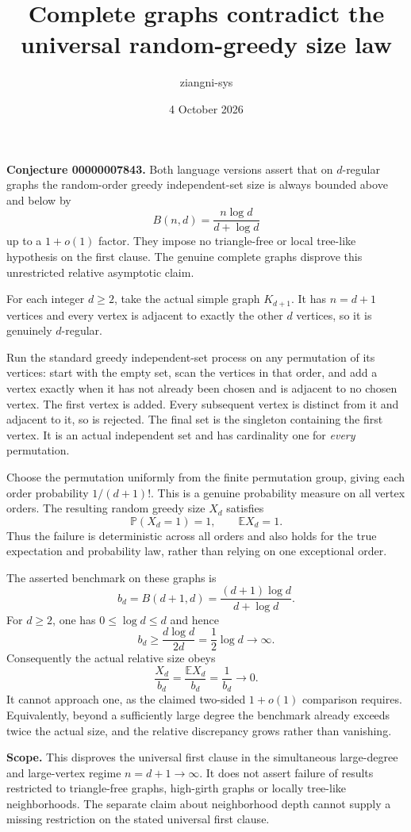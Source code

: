 \documentclass[11pt]{article}
\title{Complete graphs contradict the universal random-greedy size law}
\author{ziangni-sys}
\date{4 October 2026}
\begin{document}
\maketitle
\noindent\textbf{Conjecture 00000007843.} Both language versions assert that on \(d\)-regular graphs the random-order greedy independent-set size is always bounded above and below by
\[
 B(n,d)=\frac{n\log d}{d+\log d}
\]
up to a \(1+o(1)\) factor. They impose no triangle-free or local tree-like hypothesis on the first clause. The genuine complete graphs disprove this unrestricted relative asymptotic claim.

For each integer \(d\ge2\), take the actual simple graph \(K_{d+1}\). It has \(n=d+1\) vertices and every vertex is adjacent to exactly the other \(d\) vertices, so it is genuinely \(d\)-regular.

Run the standard greedy independent-set process on any permutation of its vertices: start with the empty set, scan the vertices in that order, and add a vertex exactly when it has not already been chosen and is adjacent to no chosen vertex. The first vertex is added. Every subsequent vertex is distinct from it and adjacent to it, so is rejected. The final set is the singleton containing the first vertex. It is an actual independent set and has cardinality one for \emph{every} permutation.

Choose the permutation uniformly from the finite permutation group, giving each order probability \(1/(d+1)!\). This is a genuine probability measure on all vertex orders. The resulting random greedy size \(X_d\) satisfies
\[
 \mathbb P(X_d=1)=1,\qquad \mathbb E X_d=1.
\]
Thus the failure is deterministic across all orders and also holds for the true expectation and probability law, rather than relying on one exceptional order.

The asserted benchmark on these graphs is
\[
 b_d=B(d+1,d)=\frac{(d+1)\log d}{d+\log d}.
\]
For \(d\ge2\), one has \(0\le\log d\le d\) and hence
\[
 b_d\ge\frac{d\log d}{2d}=\frac12\log d\longrightarrow\infty.
\]
Consequently the actual relative size obeys
\[
 \frac{X_d}{b_d}=\frac{\mathbb E X_d}{b_d}
 =\frac1{b_d}\longrightarrow0.
\]
It cannot approach one, as the claimed two-sided \(1+o(1)\) comparison requires. Equivalently, beyond a sufficiently large degree the benchmark already exceeds twice the actual size, and the relative discrepancy grows rather than vanishing.

\medskip\noindent\textbf{Scope.} This disproves the universal first clause in the simultaneous large-degree and large-vertex regime \(n=d+1\to\infty\). It does not assert failure of results restricted to triangle-free graphs, high-girth graphs or locally tree-like neighborhoods. The separate claim about neighborhood depth cannot supply a missing restriction on the stated universal first clause.
\end{document}
